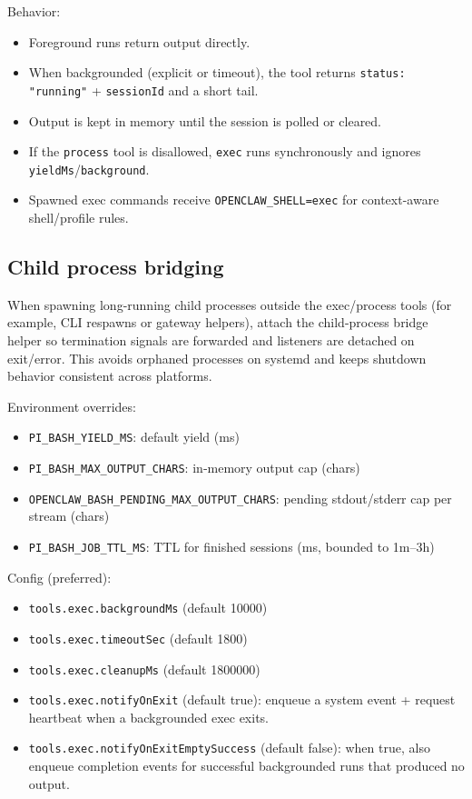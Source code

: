 Behavior:

\begin{itemize}
  \item Foreground runs return output directly.
  \item When backgrounded (explicit or timeout), the tool returns \texttt{status: "running"} + \texttt{sessionId} and a short tail.
  \item Output is kept in memory until the session is polled or cleared.
  \item If the \texttt{process} tool is disallowed, \texttt{exec} runs synchronously and ignores \texttt{yieldMs}/\texttt{background}.
  \item Spawned exec commands receive \texttt{OPENCLAW\_SHELL=exec} for context-aware shell/profile rules.
\end{itemize}


\subsection{Child process bridging}


When spawning long-running child processes outside the exec/process tools (for example, CLI respawns or gateway helpers), attach the child-process bridge helper so termination signals are forwarded and listeners are detached on exit/error. This avoids orphaned processes on systemd and keeps shutdown behavior consistent across platforms.

Environment overrides:

\begin{itemize}
  \item \texttt{PI\_BASH\_YIELD\_MS}: default yield (ms)
  \item \texttt{PI\_BASH\_MAX\_OUTPUT\_CHARS}: in‑memory output cap (chars)
  \item \texttt{OPENCLAW\_BASH\_PENDING\_MAX\_OUTPUT\_CHARS}: pending stdout/stderr cap per stream (chars)
  \item \texttt{PI\_BASH\_JOB\_TTL\_MS}: TTL for finished sessions (ms, bounded to 1m–3h)
\end{itemize}


Config (preferred):

\begin{itemize}
  \item \texttt{tools.exec.backgroundMs} (default 10000)
  \item \texttt{tools.exec.timeoutSec} (default 1800)
  \item \texttt{tools.exec.cleanupMs} (default 1800000)
  \item \texttt{tools.exec.notifyOnExit} (default true): enqueue a system event + request heartbeat when a backgrounded exec exits.
  \item \texttt{tools.exec.notifyOnExitEmptySuccess} (default false): when true, also enqueue completion events for successful backgrounded runs that produced no output.
\end{itemize}


